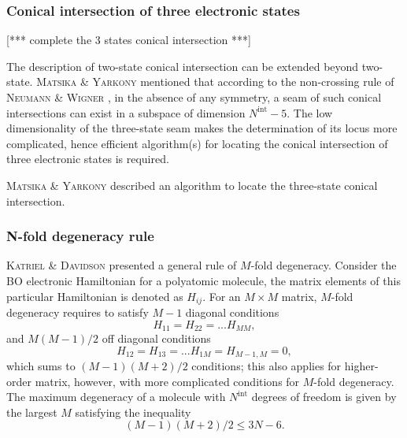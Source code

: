 \documentclass[12pt]{article}
\def\att{                    %
        \marginpar[ \hspace*{\fill} \raisebox{-0.2em}{\rule{2mm}{1.2em}} ]
        {\raisebox{-0.2em}{\rule{2mm}{1.2em}} }
        }
\def\at#1{[*** \att #1 ***]}  %
\begin{document}
\subsubsection{Conical intersection of three electronic states}
\at{complete the 3 states conical intersection}

The description of two-state conical intersection can be extended beyond two-state. \textsc{Matsika \& Yarkony} \cite{idx180} mentioned that according to the non-crossing rule of \textsc{Neumann \& Wigner} \cite{neumannwigner}, in the absence of any symmetry, a seam of such conical intersections can exist in a subspace of dimension $N^\text{int}-5$. The low dimensionality of the three-state seam makes the determination of its locus more complicated, hence efficient algorithm(s) for locating the conical intersection of three electronic states is required.

\textsc{Matsika \& Yarkony} \cite{idx180} described an algorithm to locate the three-state conical intersection. 

\subsubsection{N-fold degeneracy rule}
\textsc{Katriel \& Davidson} \cite{idx180} presented a general rule of $M$-fold degeneracy. Consider the BO electronic Hamiltonian for a polyatomic molecule, the matrix elements of this particular Hamiltonian is denoted as $H_{ij}$. For an $M \times M$ matrix, $M$-fold degeneracy requires to satisfy $M-1$ diagonal conditions
\begin{equation}
    H_{11} = H_{22} = ... H_{MM},
\end{equation}
and $M(M-1)/2$ off diagonal conditions
\begin{equation}
    H_{12} = H_{13} = ... H_{1M} = H_{M-1,M} = 0,
\end{equation}
which sums to $(M-1)(M+2)/2$ conditions; this also applies for higher-order matrix, however, with more complicated conditions for $M$-fold degeneracy. The maximum degeneracy of a molecule with $N^\text{int}$ degrees of freedom is given by the largest $M$ satisfying the inequality
\begin{equation}
    (M-1)(M+2)/2 \leq 3N-6.
\end{equation}
\end{document}
